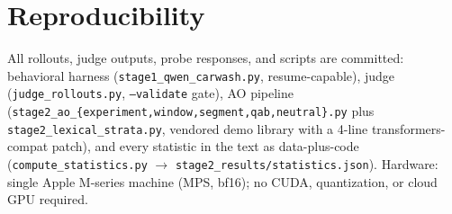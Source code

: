 \documentclass[11pt]{article}
\newcommand{\code}[1]{\texttt{#1}}
\begin{document}
\section{Reproducibility}
\label{app:repro}

All rollouts, judge outputs, probe responses, and scripts are committed:
behavioral harness (\code{stage1\_qwen\_carwash.py}, resume-capable),
judge (\code{judge\_rollouts.py}, \code{--validate} gate), AO pipeline
(\code{stage2\_ao\_\{experiment,window,segment,qab,neutral\}.py} plus
\code{stage2\_lexical\_strata.py}, vendored demo library with a 4-line
transformers-compat patch), and every statistic in the text as
data-plus-code (\code{compute\_statistics.py} $\rightarrow$
\code{stage2\_results/statistics.json}). Hardware: single Apple M-series
machine (MPS, bf16); no CUDA, quantization, or cloud GPU required.
\end{document}
